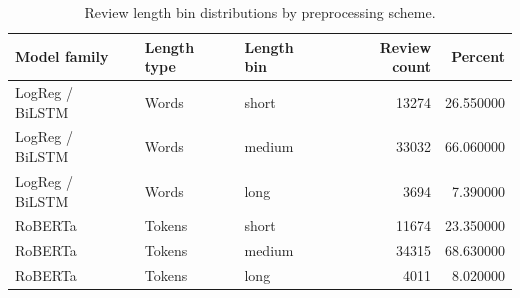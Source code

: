 \begin{table}
\caption{Review length bin distributions by preprocessing scheme.}
\label{tab:length_bins}
\begin{tabular}{lllrr}
\toprule
Model family & Length type & Length bin & Review count & Percent \\
\midrule
LogReg / BiLSTM & Words & short & 13274 & 26.550000 \\
LogReg / BiLSTM & Words & medium & 33032 & 66.060000 \\
LogReg / BiLSTM & Words & long & 3694 & 7.390000 \\
RoBERTa & Tokens & short & 11674 & 23.350000 \\
RoBERTa & Tokens & medium & 34315 & 68.630000 \\
RoBERTa & Tokens & long & 4011 & 8.020000 \\
\bottomrule
\end{tabular}
\end{table}
